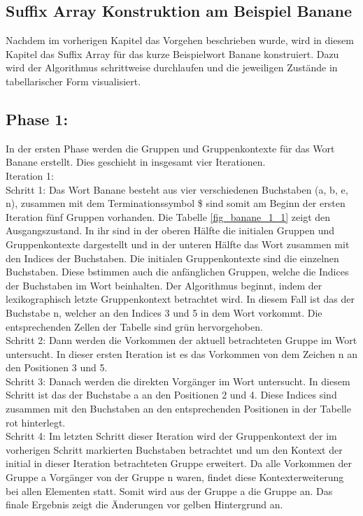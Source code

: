 \newpage
\subsection{Suffix Array Konstruktion am Beispiel Banane}
\label{gsaca:chapter3}
%
Nachdem im vorherigen Kapitel das Vorgehen beschrieben wurde, wird in diesem Kapitel das Suffix Array für das kurze Beispielwort Banane konstruiert.
Dazu wird der Algorithmus schrittweise durchlaufen und die jeweiligen Zustände in tabellarischer Form visualisiert.

\subsection*{Phase 1:}
In der ersten Phase werden die Gruppen und Gruppenkontexte für das Wort Banane erstellt. 
Dies geschieht in insgesamt vier Iterationen.\\

Iteration 1:\\
Schritt 1: Das Wort Banane besteht aus vier verschiedenen Buchstaben (a, b, e, n), zusammen mit dem Terminationssymbol \$ sind somit am Beginn der ersten Iteration fünf Gruppen vorhanden. 
Die Tabelle \ref{fig_banane_1_1} zeigt den Ausgangszustand.
In ihr sind in der oberen Hälfte die initialen Gruppen und Gruppenkontexte dargestellt und in der unteren Hälfte das Wort zusammen mit den Indices der Buchstaben. 
Die initialen Gruppenkontexte sind die einzelnen Buchstaben.
Diese bstimmen auch die anfänglichen Gruppen, welche die Indices der Buchstaben im Wort beinhalten.
Der Algorithmus beginnt, indem der lexikographisch letzte Gruppenkontext betrachtet wird. 
In diesem Fall ist das der Buchstabe n, welcher an den Indices 3 und 5 in dem Wort vorkommt. 
Die entsprechenden Zellen der Tabelle sind grün hervorgehoben. \\
Schritt 2: Dann werden die Vorkommen der aktuell betrachteten Gruppe im Wort untersucht. 
In dieser ersten Iteration ist es das Vorkommen von dem Zei\-chen n an den Positionen 3 und 5. \\
Schritt 3: Danach werden die direkten Vorgänger im Wort untersucht. 
In diesem Schritt ist das der Buchstabe a an den Positionen 2 und 4. 
Diese Indices sind zusammen mit den Buchstaben an den entsprechenden Positionen in der Tabelle rot hinterlegt. \\
Schritt 4: Im letzten Schritt dieser Iteration wird der Gruppenkontext der im vorherigen Schritt markierten Buchstaben betrachtet und um den Kontext der initial in dieser Iteration betrachteten Gruppe erweitert. 
Da alle Vorkommen der Gruppe a Vorgänger von der Gruppe n waren, findet diese Kontexterweiterung bei allen Elementen statt. 
Somit wird aus der Gruppe a die Gruppe an. Das finale Ergebnis zeigt die Änderungen vor gelben Hintergrund an.\\

